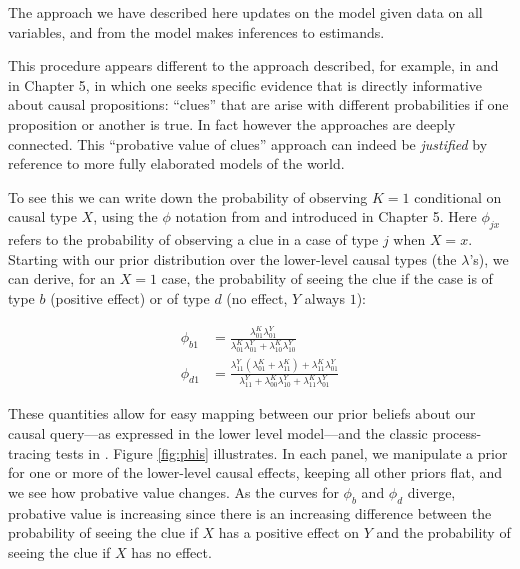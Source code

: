 \documentclass[
  12pt,
]{book}
\begin{document}
The approach we have described here updates on the model given data on all variables, and from the model makes inferences to estimands.

This procedure appears different to the approach described, for example, in \citet{collier2004sources} and in Chapter 5, in which one seeks specific evidence that is directly informative about causal propositions: ``clues'' that are arise with different probabilities if one proposition or another is true. In fact however the approaches are deeply connected. This ``probative value of clues'' approach can indeed be \emph{justified} by reference to more fully elaborated models of the world.

To see this we can write down the probability of observing \(K=1\) conditional on causal type \(X\), using the \(\phi\) notation from \citet{humphreys2015mixing} and introduced in Chapter 5. Here \(\phi_{jx}\) refers to the probability of observing a clue in a case of type \(j\) when \(X=x\). Starting with our prior distribution over the lower-level causal types (the \(\lambda\)'s), we can derive, for an \(X=1\) case, the probability of seeing the clue if the case is of type \(b\) (positive effect) or of type \(d\) (no effect, \(Y\) always \(1\)):

\begin{equation}
\begin{split}
\phi_{b1} & = \frac{\lambda_{01}^{K}\lambda_{01}^{Y}}{\lambda_{01}^{K}\lambda_{01}^{Y}+\lambda_{10}^{K}\lambda_{10}^{Y}}\\ 
\phi_{d1} & = \frac{\lambda_{11}^{Y}(\lambda_{01}^{K}+\lambda_{11}^{K})+\lambda_{11}^{K}\lambda_{01}^{Y}}{\lambda_{11}^{Y} + \lambda_{00}^{K}\lambda_{10}^{Y} + \lambda_{11}^{K}\lambda_{01}^{Y}}
\end{split}
\label{eqn:phisfromlambdas}
\end{equation}

These quantities allow for easy mapping between our prior beliefs about our causal query---as expressed in the lower level model---and the classic process-tracing tests in \citet{Van-Evera:1997}. Figure \ref{fig:phis} illustrates. In each panel, we manipulate a prior for one or more of the lower-level causal effects, keeping all other priors flat, and we see how probative value changes. As the curves for \(\phi_b\) and \(\phi_d\) diverge, probative value is increasing since there is an increasing difference between the probability of seeing the clue if \(X\) has a positive effect on \(Y\) and the probability of seeing the clue if \(X\) has no effect.
\end{document}

